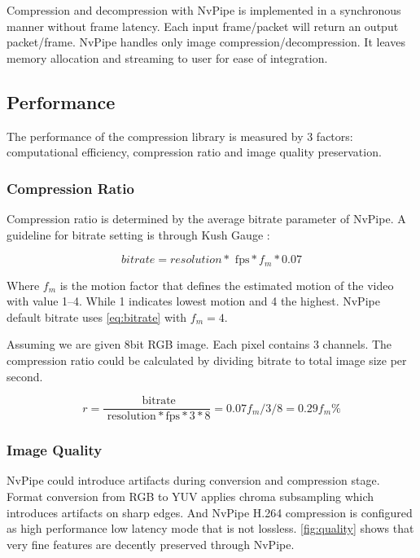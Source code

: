 \documentclass[review]{vgtc}                 %
\begin{document}
Compression and decompression with NvPipe is implemented in a synchronous manner without frame latency. Each input frame/packet will return an output packet/frame. NvPipe handles only image compression/decompression. It leaves memory allocation and streaming to user for ease of integration.

\subsection{Performance}

The performance of the compression library is measured by 3 factors: computational efficiency, compression ratio and image quality preservation.

\subsubsection{Compression Ratio}

Compression ratio is determined by the average bitrate parameter of NvPipe. A guideline for bitrate setting is through Kush Gauge \cite{iszaidyinvestigation}:

\begin{equation}
\label{eq:bitrate}
 bitrate = resolution * \text{ fps} * f_m * 0.07
\end{equation}

Where \(f_m\) is the motion factor that defines the estimated motion of the video with value \numrange{1}{4}. While 1 indicates lowest motion and 4 the highest. NvPipe default bitrate uses \cref{eq:bitrate} with \(f_m=4\).

Assuming we are given 8bit RGB image. Each pixel contains 3 channels. The compression ratio could be calculated by dividing bitrate to total image size per second.

\begin{equation}
\label{eq:compress_ratio}
 r = \frac{ \text{ bitrate}}{ \text{ resolution} * \text{fps} * 3 * 8} = 0.07f_m/3/8 = 0.29f_m\%
\end{equation}

\subsubsection{Image Quality}

NvPipe could introduce artifacts during conversion and compression stage. Format conversion from RGB to YUV applies chroma subsampling which introduces artifacts on sharp edges. And NvPipe H.264 compression is configured as high performance low latency mode that is not lossless. \cref{fig:quality} shows that very fine features are decently preserved through NvPipe.
\end{document}
